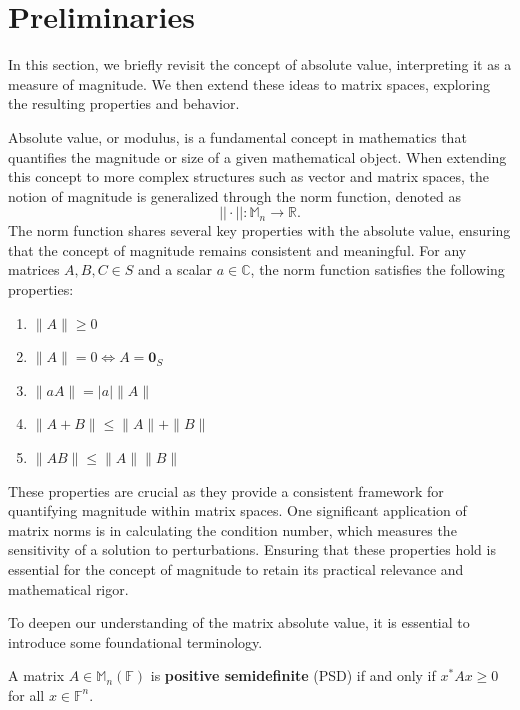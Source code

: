 \section{Preliminaries}
In this section, we briefly revisit the concept of absolute value, interpreting it as a measure of magnitude. We then extend these ideas to matrix spaces, exploring the resulting properties and behavior.

Absolute value, or modulus, is a fundamental concept in mathematics that quantifies the magnitude or size of a given mathematical object. When extending this concept to more complex structures such as vector and matrix spaces, the notion of magnitude is generalized through the norm function, denoted as
\[
||\cdot||: \mathbb{M}_n \rightarrow \mathbb{R}.
\]
The norm function shares several key properties with the absolute value, ensuring that the concept of magnitude remains consistent and meaningful. For any matrices \(A, B, C \in S\) and a scalar \(a \in \mathbb{C}\), the norm function satisfies the following properties:
\begin{enumerate}
    \item $\|A\| \geq 0$ 
    \item $ \|A\|= 0 \Leftrightarrow A = \textbf{0}_S$ 
    \item  $\|aA\| = |a|\|A\|$ 
    \item $\|A+B\| \leq \|A\| + \|B\|$ 
    \item \( \|AB\| \leq \|A\|\|B\| \) 
\end{enumerate}
These properties are crucial as they provide a consistent framework for quantifying magnitude within matrix spaces. One significant application of matrix norms is in calculating the condition number, which measures the sensitivity of a solution to perturbations. Ensuring that these properties hold is essential for the concept of magnitude to retain its practical relevance and mathematical rigor.
\par To deepen our understanding of the matrix absolute value, it is essential to introduce some foundational terminology.
\begin{definition}
    A matrix $A \in \mathbb{M}_n(\mathbb{F})$ is \textbf{positive semidefinite} (PSD) if and only if $x^* A x \geq 0$ for all $x \in \mathbb{F}^n$.
\end{definition}
